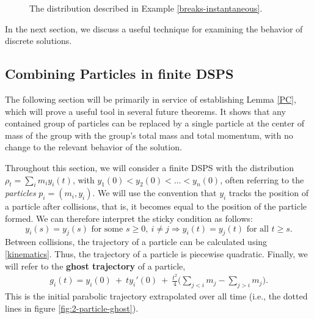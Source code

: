 \documentclass[11pt]{article}
\numberwithin{equation}{section}
\begin{document}
\begin{figure}

            \caption{The distribution described in Example \ref{breaks-instantaneous}.}
            \label{projection-break-figure}
        \end{figure}   
        
        In the next section, we discuss a useful technique for examining the behavior of discrete solutions. 
    \subsection{Combining Particles in finite DSPS}\label{particle-combining-section}
    The following section will be primarily in service of establishing Lemma \ref{PC}, which will prove a useful tool in several future theorems. It shows that any contained group of particles can be replaced by a single particle at the center of mass of the group with the group's total mass and total momentum, with no change to the relevant behavior of the solution. 
    
    Throughout this section, we will consider a finite DSPS with the distribution $\rho_t=\sum_i m_i y_i(t)$, with $y_1(0)<y_2(0)<\ldots<y_n(0)$, often referring to the \emph{particles} $p_i=(m_i,y_i)$. We will use the convention that $y_i$ tracks the position of a particle after collisions, that is, it becomes equal to the position of the particle formed. We can therefore interpret the sticky condition as follows: 
    $$y_i(s)=y_j(s)\mbox{ for some }s\geq0,\ i\neq j\Rightarrow y_i(t)=y_j(t)\mbox{ for all }t\geq s.$$ Between collisions, the trajectory of a particle can be calculated using \eqref{kinematics}. Thus, the trajectory of a particle is piecewise quadratic. Finally, we will refer to the \textbf{ghost trajectory} of a particle, 
    \begin{align}\label{ghost-trajectory}
        g_i(t)=y_i(0)\ +\ ty_i'(0)\ +\ \frac{t^2}{4}\Big(\sum_{j<i}m_j-\sum_{j>i}m_j\Big).
    \end{align}
    This is the initial parabolic trajectory extrapolated over all time (i.e., the dotted lines in figure \ref{fig:2-particle-ghost}).
\end{document}
